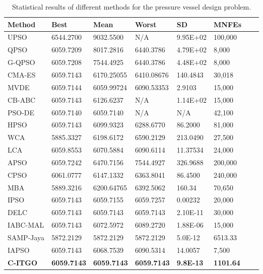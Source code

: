 
\begin{table*}[h]
    \tiny
    \begin{center}
    
    \begin{tabular}{ P{2.0cm} P{2.0cm} P{2.0cm} P{2.0cm} P{2.0cm} P{2.0cm} P{2.0cm} P{2.0cm}  }
    \hline
    \textbf{Method} & \textbf{Best} & \textbf{Mean} & \textbf{Worst} & \textbf{SD} & \textbf{MNFEs} \\
    \hline
    
    UPSO & 6544.2700 & 9032.5500 & N/A & 9.95E+02 & 100,000 \\
    QPSO & 6059.7209 & 8017.2816 & 6440.3786 & 4.79E+02 & 8,000 \\
    G-QPSO & 6059.7208 & 7544.4925 & 6440.3786 & 4.48E+02 & 8,000 \\
    CMA-ES & 6059.7143 & 6170.25055 & 6410.08676 & 140.4843 & 30,018 \\
    MVDE & 6059.7144 & 6059.99724 & 6090.53353 & 2.9103 & 15,000 \\ 
    CB-ABC & 6059.7143 & 6126.6237 & N/A & 1.14E+02 & 15,000 \\
    PSO-DE & 6059.7140 & 6059.7140 & N/A & N/A & 42,100 \\
    HPSO & 6059.7143 & 6099.9323 & 6288.6770 & 86.2000 & 81,000 \\
    WCA & 5885.3327 & 6198.6172 & 6590.2129 & 213.0490 & 27,500 \\
    LCA & 6059.8553 & 6070.5884 & 6090.6114 & 11.37534 & 24,000 \\
    APSO & 6059.7242 & 6470.7156 & 7544.4927 & 326.9688 & 200,000 \\
    CPSO & 6061.0777 & 6147.1332 & 6363.8041 & 86.4500 & 240,000 \\
    MBA & 5889.3216 & 6200.64765 & 6392.5062 & 160.34 & 70,650 \\    
    IPSO & 6059.7143 & 6059.7155 & 6059.7257 & 0.00232 & 20,000 \\
    DELC & 6059.7143 & 6059.7143 & 6059.7143 & 2.10E-11 & 30,000 \\  
    IABC-MAL & 6059.7143 & 6072.5972 & 6089.2720 & 1.88E-06 & 15,000 \\
    SAMP-Jaya & 5872.2129 & 5872.2129 & 5872.2129 & 5.0E-12 & 6513.33 \\    
    IAPSO & 6059.7143 & 6068.7539 & 6090.5314 & 14.0057 & 7,500 \\
    \textbf{C-ITGO} & \bf{6059.7143} & \bf{6059.7143} & \bf{6059.7143} & \bf{9.8E-13} & \bf{1101.64} \\
    
    \hline
    \end{tabular}
    \end{center}
    \vspace*{-6mm}
    \caption{Statistical results of different methods for the pressure vessel design problem. \\[1em]}
    \label{tab:PV}
    \end{table*}
    
    